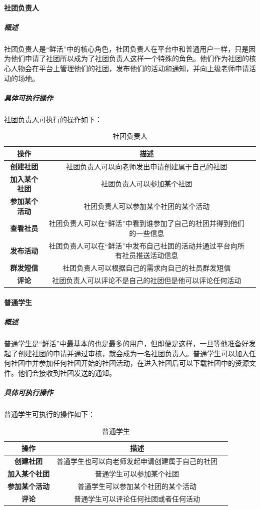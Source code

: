 \documentclass[UTF8]{ctexart}
\begin{document}
\paragraph{社团负责人}
\subparagraph{概述}
社团负责人是“鲜活”中的核心角色，社团负责人在平台中和普通用户一样，只是因为他们申请了社团所以成为了社团负责人这样一个特殊的角色。他们作为社团的核心人物会在平台上管理他们的社团，发布他们的活动和通知，并向上级老师申请活动的场地。
\subparagraph{具体可执行操作}
社团负责人可执行的操作如下：
\newline
\newline
\begin{table}[H]
\centering
\caption{社团负责人}
\begin{tabular}{ccc}
\toprule
操作& 描述\\
\midrule
\textbf{创建社团}& 社团负责人可以向老师发出申请创建属于自己的社团\\
\textbf{加入某个社团}& 社团负责人可以参加某个社团\\
\textbf{参加某个活动}&社团负责人可以参加某个社团的某个活动\\
\textbf{查看社员}&社团负责人可以在“鲜活”中看到谁参加了自己的社团并得到他们的一些信息\\
\textbf{发布活动}&社团负责人可以在“鲜活”中发布自己社团的活动并通过平台向所有社员推送活动信息\\
\textbf{群发短信}& 社团负责人可以根据自己的需求向自己的社员群发短信\\
\textbf{评论}& 社团负责人可以评论不是自己的社团但是他可以评论任何活动\\
\bottomrule
\end{tabular}
\end{table}

\paragraph{普通学生}
\subparagraph{概述}
普通学生是“鲜活”中最基本的也是最多的用户，但即便是这样，一旦等他准备好发起了创建社团的申请并通过审核，就会成为一名社团负责人。普通学生可以加入任何社团中并参加任何社团开始的社团活动，在进入社团后可以下载社团中的资源文件。他们会接收到社团发送的通知。
\subparagraph{具体可执行操作}
普通学生可执行的操作如下：
\newline
\newline
\begin{table}[H]
\centering
\caption{普通学生}
\begin{tabular}{ccc}
\toprule
操作& 描述\\
\midrule
\textbf{创建社团}& 普通学生也可以向老师发起申请创建属于自己的社团\\
\textbf{加入某个社团}& 普通学生可以参加某个社团\\
\textbf{参加某个活动}& 普通学生可以参加某个社团的某个活动\\
\textbf{评论}& 普通学生可以评论任何社团或者任何活动\\
\bottomrule
\end{tabular}
\end{table}
\end{document}
